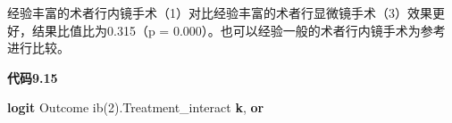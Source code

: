 \documentclass[
  chinese-hans,
  letterpaper,
  DIV=11,
  numbers=noendperiod]{scrreprt}
\newenvironment{Shaded}{\begin{snugshade}}{\end{snugshade}}
\newcommand{\KeywordTok}[1]{\textcolor[rgb]{0.00,0.23,0.31}{\textbf{#1}}}
\newcommand{\NormalTok}[1]{\textcolor[rgb]{0.00,0.23,0.31}{#1}}
\begin{document}
经验丰富的术者行内镜手术（1）对比经验丰富的术者行显微镜手术（3）效果更好，结果比值比为0.315（p
= 0.000）。也可以经验一般的术者行内镜手术为参考进行比较。

\begin{tcolorbox}[enhanced jigsaw, arc=.35mm, bottomrule=.15mm, breakable, colback=white, colframe=quarto-callout-note-color-frame, left=2mm, leftrule=.75mm, opacityback=0, rightrule=.15mm, toprule=.15mm]

\vspace{-3mm}\textbf{代码9.15}\vspace{3mm}

\begin{Shaded}
\begin{Highlighting}[]
\KeywordTok{logit}\NormalTok{ Outcome ib(2).Treatment\_interact }\KeywordTok{k}\NormalTok{, }\KeywordTok{or}
\end{Highlighting}
\end{Shaded}

\end{tcolorbox}
\end{document}
